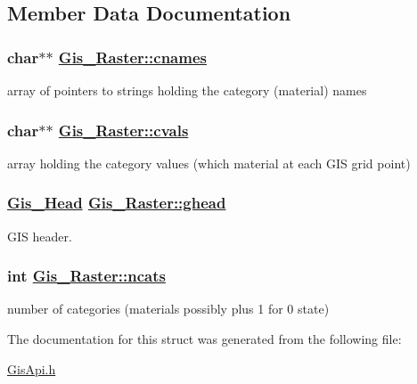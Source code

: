 \subsection{Member Data Documentation}
\hypertarget{structGis__Raster_o3}{
\subsubsection[cnames]{\setlength{\rightskip}{0pt plus 5cm}char$\ast$$\ast$ \hyperlink{structGis__Raster_o3}{Gis\_\-Raster::cnames}}}
\label{structGis__Raster_o3}


array of pointers to strings holding the category (material) names 

\hypertarget{structGis__Raster_o2}{
\subsubsection[cvals]{\setlength{\rightskip}{0pt plus 5cm}char$\ast$$\ast$ \hyperlink{structGis__Raster_o2}{Gis\_\-Raster::cvals}}}
\label{structGis__Raster_o2}


array holding the category values (which material at each GIS grid point) 

\hypertarget{structGis__Raster_o0}{
\subsubsection[ghead]{\setlength{\rightskip}{0pt plus 5cm}\hyperlink{structGis__Head}{Gis\_\-Head} \hyperlink{structGis__Raster_o0}{Gis\_\-Raster::ghead}}}
\label{structGis__Raster_o0}


GIS header. 

\hypertarget{structGis__Raster_o1}{
\subsubsection[ncats]{\setlength{\rightskip}{0pt plus 5cm}int \hyperlink{structGis__Raster_o1}{Gis\_\-Raster::ncats}}}
\label{structGis__Raster_o1}


number of categories (materials possibly plus 1 for 0 state) 



The documentation for this struct was generated from the following file:\begin{CompactItemize}
\item 
\hyperlink{GisApi_8h}{Gis\-Api.h}\end{CompactItemize}
